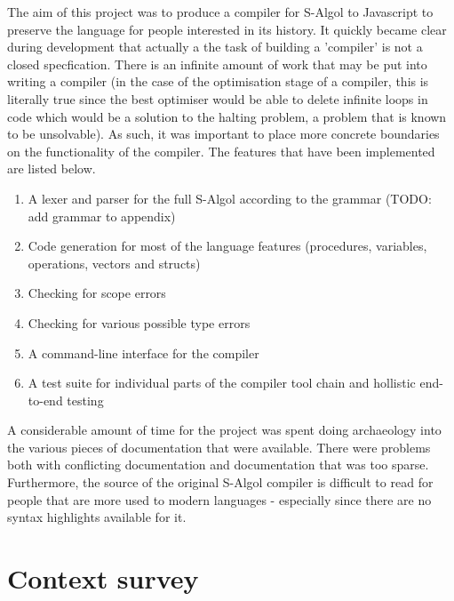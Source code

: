 \documentclass{article}
\begin{document}
The aim of this project was to produce a compiler for S-Algol to Javascript to preserve the language for people interested in its history. It quickly became clear during development that actually a the task of building a 'compiler' is not a closed specfication. There is an infinite amount of work that may be put into writing a compiler (in the case of the optimisation stage of a compiler, this is literally true since the best optimiser would be able to delete infinite loops in code which would be a solution to the halting problem, a problem that is known to be unsolvable). As such, it was important to place more concrete boundaries on the functionality of the compiler. The features that have been implemented are listed below.

\begin{enumerate}
\item A lexer and parser for the full S-Algol according to the grammar (TODO: add grammar to appendix)
\item Code generation for most of the language features (procedures, variables, operations, vectors and structs)
\item Checking for scope errors
\item Checking for various possible type errors
\item A command-line interface for the compiler
\item A test suite for individual parts of the compiler tool chain and hollistic end-to-end testing
\end{enumerate}

A considerable amount of time for the project was spent doing archaeology into the various pieces of documentation that were available. There were problems both with conflicting documentation and documentation that was too sparse. Furthermore, the source of the original S-Algol compiler is difficult to read for people that are more used to modern languages - especially since there are no syntax highlights available for it.


\section{Context survey}
\end{document}
